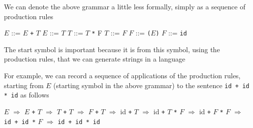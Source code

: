 \documentclass[8pt,a4paper,compress]{beamer}
\newcommand{\mm}[1]{$#1$}
\newenvironment{spaced}
{
\smallskip
\hspace{.5cm}
\begin{minipage}[c]{\textwidth}
}
{
\end{minipage}
\smallskip
}
\begin{document}
\begin{frame}[fragile]
\pause

We can denote the above grammar a little less formally, simply as a sequence of production rules

\text{ }
\begin{spaced}
\begin{production}
\mm{E} ::= \mm{E} \lstinline{+} \mm{T}
\mm{E} ::= \mm{T}
\mm{T} ::= \mm{T}  \lstinline{*} {F}
\mm{T} ::= \mm{F}
\mm{F} ::= \lstinline{(}\mm{E}\lstinline{)}
\mm{F} ::= \lstinline{id}
\end{production}
\end{spaced}

\pause
\bigskip

The start symbol is important because it is from this symbol, using the production rules, that we can generate strings in a language

\pause
\bigskip

For example, we can record a sequence of applications of the production rules, starting from $E$ (starting symbol in the above grammar) to the sentence \lstinline{id + id * id} as follows

\text{ }
\begin{spaced}
\begin{production}
\mm{E} \mm{\Rightarrow} \mm{E} \lstinline{+} \mm{T}
   \mm{\Rightarrow} \mm{T} \lstinline{+} \mm{T}
   \mm{\Rightarrow} \mm{F} \lstinline{+} \mm{T}
   \mm{\Rightarrow} id \lstinline{+} \mm{T}
   \mm{\Rightarrow} id \lstinline{+} \mm{T} \lstinline{*} \mm{F}
   \mm{\Rightarrow} id \lstinline{+} \mm{F} \lstinline{*} \mm{F}
   \mm{\Rightarrow} \lstinline{id + id *} \mm{F}
   \mm{\Rightarrow} \lstinline{id + id * id}
\end{production}
\end{spaced}
\end{frame}
\end{document}
